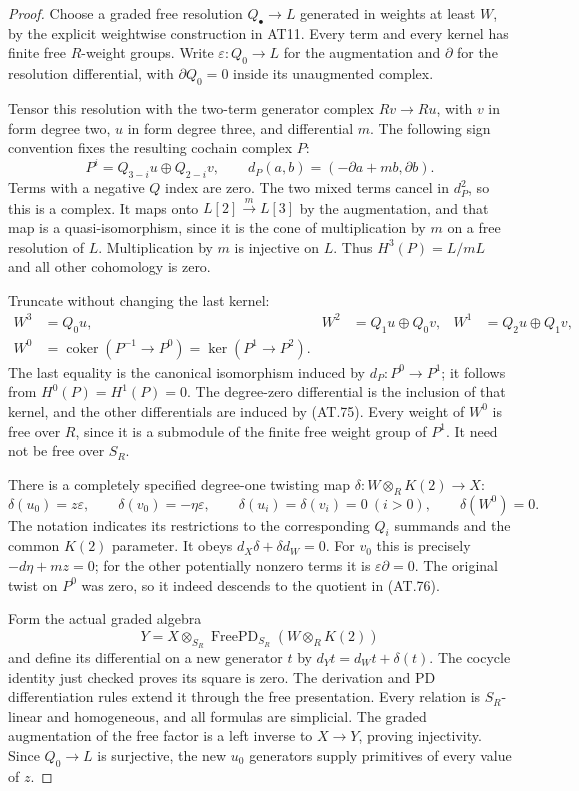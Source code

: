 \begin{proof}
Choose a graded free resolution $Q_\bullet\to L$
generated in weights at least $W$, by the explicit
weightwise construction in AT11.
Every term and every kernel has finite free
$R$-weight groups. Write $\varepsilon:Q_0\to L$
for the augmentation and $\partial$ for the
resolution differential, with $\partial Q_0=0$
inside its unaugmented complex.

Tensor this resolution with the two-term generator
complex $Rv\to Ru$, with $v$ in form degree two,
$u$ in form degree three, and differential $m$.
The following sign convention fixes the resulting
cochain complex $P$:
\[
 P^i=Q_{3-i}u\oplus Q_{2-i}v,\qquad
 d_P(a,b)=(-\partial a+mb,\partial b).
 \tag{AT.75}
\]
Terms with a negative $Q$ index are zero.
The two mixed terms cancel in $d_P^2$, so this
is a complex. It maps onto
$L[2]\xrightarrow{m}L[3]$ by the augmentation,
and that map is a quasi-isomorphism, since it
is the cone of multiplication by $m$ on a free
resolution of $L$.
Multiplication by $m$ is injective on $L$.
Thus $H^3(P)=L/mL$ and all other cohomology is zero.

Truncate without changing the last kernel:
\[
 \begin{aligned}
 W^3&=Q_0u,&
 W^2&=Q_1u\oplus Q_0v,&
 W^1&=Q_2u\oplus Q_1v,\\
 W^0&=\operatorname{coker}(P^{-1}\to P^0)
       =\ker(P^1\to P^2).
 \end{aligned}
 \tag{AT.76}
\]
The last equality is the canonical isomorphism
induced by $d_P:P^0\to P^1$; it follows from
$H^0(P)=H^1(P)=0$.
The degree-zero differential is the inclusion
of that kernel, and the other differentials
are induced by \textup{(AT.75)}.
Every weight of $W^0$ is free over $R$, since
it is a submodule of the finite free weight
group of $P^1$.
It need not be free over $S_R$.

There is a completely specified degree-one
twisting map
$\delta:W\otimes_R K(2)\to X$:
\[
 \delta(u_0)=z\varepsilon,\qquad
 \delta(v_0)=-\eta\varepsilon,\qquad
 \delta(u_i)=\delta(v_i)=0\ (i>0),\qquad
 \delta(W^0)=0.
 \tag{AT.77}
\]
The notation indicates its restrictions to the
corresponding $Q_i$ summands and the common
$K(2)$ parameter.
It obeys $d_X\delta+\delta d_W=0$.
For $v_0$ this is precisely $-d\eta+mz=0$;
for the other potentially nonzero terms it is
$\varepsilon\partial=0$.
The original twist on $P^0$ was zero, so it
indeed descends to the quotient in (AT.76).

Form the actual graded algebra
\[
 Y=X\otimes_{S_R}
       \operatorname{FreePD}_{S_R}(W\otimes_R K(2))
 \tag{AT.78}
\]
and define its differential on a new generator $t$
by $d_Yt=d_Wt+\delta(t)$.
The cocycle identity just checked proves its square
is zero. The derivation and PD differentiation
rules extend it through the free presentation.
Every relation is $S_R$-linear and homogeneous,
and all formulas are simplicial.
The graded augmentation of the free factor is
a left inverse to $X\to Y$, proving injectivity.
Since $Q_0\to L$ is surjective, the new $u_0$
generators supply primitives of every value of $z$.


\end{proof}
